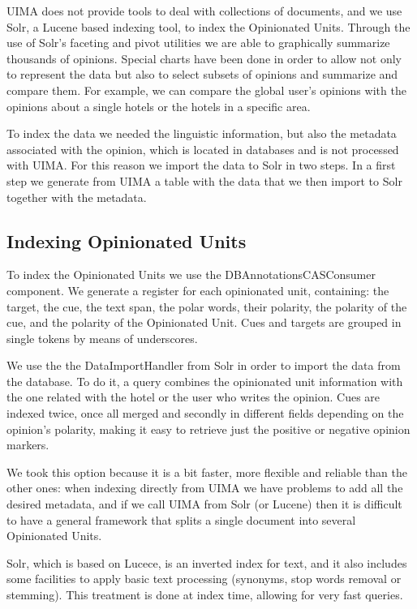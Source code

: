 \documentclass{llncs}
\begin{document}
UIMA does not provide tools to deal with collections of documents, and we use Solr, a Lucene based indexing tool, to index the Opinionated Units. Through the use of Solr's faceting and pivot utilities we are able to graphically summarize thousands of opinions. Special charts have been done in order to allow not only to represent the data but also to select subsets of opinions and summarize and compare them. For example, we can compare the global user's opinions with the opinions about a single hotels or the hotels in a specific area. 

To index the data we needed the linguistic information, but also the metadata associated with the opinion, which is located in databases and is not processed with UIMA. For this reason we import the data to Solr in two steps. In a first step we generate from UIMA a table with the data that we then import to Solr together with the metadata.

\subsection{Indexing Opinionated Units}

To index the Opinionated Units we use the DBAnnotationsCASConsumer component. We generate a register for each opinionated unit, containing: the target, the cue, the text span, the polar words, their polarity, the polarity of the cue, and the polarity of the Opinionated Unit. Cues and targets are grouped in single tokens by means of underscores.

We use the the DataImportHandler from Solr in order to import the data from the database. To do it, a query combines the opinionated unit information with the one related with the hotel or the user who writes the opinion. Cues are indexed twice, once all merged and secondly in different fields depending on the opinion's polarity, making it easy to retrieve just the positive or negative opinion markers.

We took this option because it is a bit faster, more flexible and reliable than the other ones: when indexing directly from UIMA we have problems to add all the desired metadata, and if we call UIMA from Solr (or Lucene) then it is difficult to have a general framework that splits a single document into several Opinionated Units.

Solr, which is based on Lucece, is an inverted index for text, and it also includes some facilities to apply basic text processing (synonyms, stop words removal or stemming). This treatment is done at index time, allowing for very fast queries.
  
\end{document}
